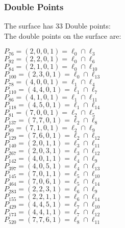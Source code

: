 \documentclass{article}
\begin{document}
{\subsubsection*{Double Points}
The surface has 33 Double points:\\
The double points on the surface are:\\
\begin{multicols}{2}
\noindent
$P_{76} = ( 2, 0, 0, 1 ) = \ell_{0} \cap \ell_{3} $\\
$P_{92} = ( 2, 2, 0, 1 ) = \ell_{0} \cap \ell_{6} $\\
$P_{84} = ( 2, 1, 0, 1 ) = \ell_{0} \cap \ell_{10} $\\
$P_{100} = ( 2, 3, 0, 1 ) = \ell_{0} \cap \ell_{13} $\\
$P_{78} = ( 4, 0, 0, 1 ) = \ell_{1} \cap \ell_{4} $\\
$P_{110} = ( 4, 4, 0, 1 ) = \ell_{1} \cap \ell_{7} $\\
$P_{86} = ( 4, 1, 0, 1 ) = \ell_{1} \cap \ell_{11} $\\
$P_{118} = ( 4, 5, 0, 1 ) = \ell_{1} \cap \ell_{14} $\\
$P_{81} = ( 7, 0, 0, 1 ) = \ell_{2} \cap \ell_{5} $\\
$P_{137} = ( 7, 7, 0, 1 ) = \ell_{2} \cap \ell_{8} $\\
$P_{89} = ( 7, 1, 0, 1 ) = \ell_{2} \cap \ell_{9} $\\
$P_{129} = ( 7, 6, 0, 1 ) = \ell_{2} \cap \ell_{12} $\\
$P_{140} = ( 2, 0, 1, 1 ) = \ell_{3} \cap \ell_{11} $\\
$P_{267} = ( 2, 0, 3, 1 ) = \ell_{3} \cap \ell_{12} $\\
$P_{142} = ( 4, 0, 1, 1 ) = \ell_{4} \cap \ell_{9} $\\
$P_{397} = ( 4, 0, 5, 1 ) = \ell_{4} \cap \ell_{13} $\\
$P_{145} = ( 7, 0, 1, 1 ) = \ell_{5} \cap \ell_{10} $\\
$P_{464} = ( 7, 0, 6, 1 ) = \ell_{5} \cap \ell_{14} $\\
$P_{283} = ( 2, 2, 3, 1 ) = \ell_{6} \cap \ell_{9} $\\
$P_{155} = ( 2, 2, 1, 1 ) = \ell_{6} \cap \ell_{14} $\\
$P_{429} = ( 4, 4, 5, 1 ) = \ell_{7} \cap \ell_{10} $\\
$P_{173} = ( 4, 4, 1, 1 ) = \ell_{7} \cap \ell_{12} $\\
$P_{520} = ( 7, 7, 6, 1 ) = \ell_{8} \cap \ell_{11} $\\

\end{multicols}}
\end{document}
